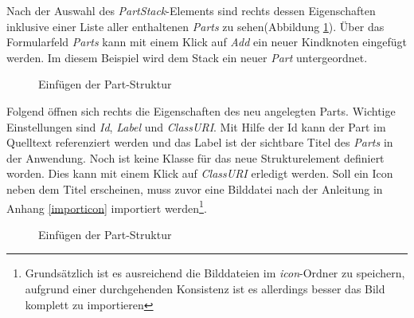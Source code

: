 Nach der Auswahl des \textit{PartStack}-Elements sind rechts dessen Eigenschaften inklusive einer Liste aller enthaltenen \textit{Parts} zu sehen(Abbildung \ref{partadd}). Über das Formularfeld \textit{Parts} kann mit einem Klick auf \textit{Add} ein neuer Kindknoten eingefügt werden. Im diesem Beispiel wird dem Stack ein neuer \textit{Part} untergeordnet.

\begin{figure}[H]
  \vspace{0.5cm}
  \centering
   \caption{Einfügen der Part-Struktur}
  \label{partadd}
  \vspace{0.5cm}
\end{figure}

Folgend öffnen sich rechts die Eigenschaften des neu angelegten Parts. Wichtige Einstellungen sind \textit{Id}, \textit{Label} und \textit{ClassURI}. Mit Hilfe der Id kann der Part im Quelltext referenziert werden und das Label ist der sichtbare Titel des \textit{Parts} in der Anwendung. Noch ist keine Klasse für das neue Strukturelement definiert worden. Dies kann mit einem Klick auf \textit{ClassURI} erledigt werden. Soll ein Icon neben dem Titel erscheinen, muss zuvor eine Bilddatei nach der Anleitung in Anhang \ref{importicon} importiert werden\footnote{Grundsätzlich ist es ausreichend die Bilddateien im \textit{icon}-Ordner zu speichern, aufgrund einer durchgehenden Konsistenz ist es allerdings besser das Bild komplett zu importieren}.

\begin{figure}[H]
  \vspace{0.5cm}
  \centering
   \caption{Einfügen der Part-Struktur}
  \label{partpart}
  \vspace{0.5cm}
\end{figure}

